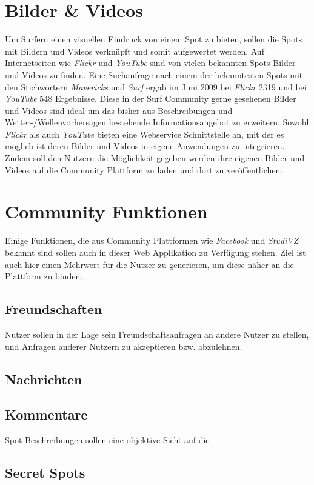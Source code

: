 \section{Bilder \& Videos}

Um Surfern einen visuellen Eindruck von einem Spot zu bieten, sollen
die Spots mit Bildern und Videos verknüpft und somit aufgewertet
werden. Auf Internetseiten wie \textit{Flickr} und \textit{YouTube}
sind von vielen bekannten Spots Bilder und Videos zu finden. Eine
Suchanfrage nach einem der bekanntesten Spots mit den Stichwörtern
\textit{Mavericks} und \textit{Surf} ergab im Juni 2009 bei
\textit{Flickr} 2319 und bei \textit{YouTube} 548 Ergebnisse. Diese in
der Surf Community gerne gesehenen Bilder und Videos sind ideal um das
bisher aus Beschreibungen und Wetter-/Wellenvorhersagen bestehende
Informationsangebot zu erweitern. Sowohl \textit{Flickr} als auch
\textit{YouTube} bieten eine Webservice Schnittstelle an, mit der es
möglich ist deren Bilder und Videos in eigene Anwendungen zu
integrieren. Zudem soll den Nutzern die Möglichkeit gegeben werden
ihre eigenen Bilder und Videos auf die Community Plattform zu laden
und dort zu veröffentlichen.

\section{Community Funktionen}

Einige Funktionen, die aus Community Plattformen wie \textit{Facebook}
und \textit{StudiVZ} bekannt sind sollen auch in dieser Web
Applikation zu Verfügung stehen. Ziel ist auch hier einen Mehrwert für
die Nutzer zu generieren, um diese näher an die Plattform zu binden.

\subsection{Freundschaften}
Nutzer sollen in der Lage sein Freundschaftsanfragen an andere Nutzer
zu stellen, und Anfragen anderer Nutzern zu akzeptieren
bzw. abzulehnen.

\subsection{Nachrichten}

\subsection{Kommentare}
\label{subsec:Kommentare}

Spot Beschreibungen sollen eine objektive Sicht auf die


\subsection{Secret Spots}

